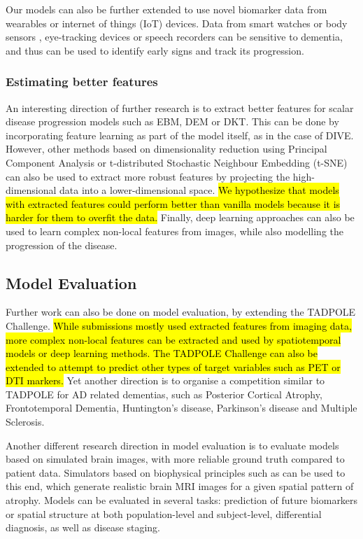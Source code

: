 Our models can also be further extended to use novel biomarker data from wearables or internet of things (IoT) devices. Data from smart watches or body sensors \cite{hsu2014gait}, eye-tracking devices \cite{hutton1984eye} or speech recorders \cite{hoffmann2010temporal} can be sensitive to dementia, and thus can be used to identify early signs and track its progression. 

\subsubsection{Estimating better features}
\label{sec:conMetFea}

An interesting direction of further research is to extract better features for scalar disease progression models such as EBM, DEM or DKT. This can be done by incorporating feature learning as part of the model itself, as in the case of DIVE. However, other methods based on dimensionality reduction using Principal Component Analysis or t-distributed Stochastic Neighbour Embedding (t-SNE) \cite{hinton2003stochastic} can also be used to extract more robust features by projecting the high-dimensional data into a lower-dimensional space. \hl{We hypothesize that  models with extracted features could perform better than vanilla models because it is harder for them to overfit the data.} Finally, deep learning approaches can also be used to learn complex non-local features from images, while also modelling the progression of the disease.

\subsection{Model Evaluation}
\label{sec:conEva}

Further work can also be done on model evaluation, by extending the TADPOLE Challenge. \hl{While submissions mostly used extracted features from imaging data, more complex non-local features can be extracted and used by spatiotemporal models or deep learning methods. The TADPOLE Challenge can also be extended to attempt to predict other types of target variables such as PET or DTI markers.} Yet another direction is to organise a competition similar to TADPOLE for AD related dementias, such as Posterior Cortical Atrophy, Frontotemporal Dementia, Huntington's disease, Parkinson's disease and Multiple Sclerosis.

Another different research direction in model evaluation is to evaluate models based on simulated brain images, with more reliable ground truth compared to patient data. Simulators based on biophysical principles such as \cite{khanal2016biophysical} can be used to this end, which generate realistic brain MRI images for a given spatial pattern of atrophy. Models can be evaluated in several tasks: prediction of future biomarkers or spatial structure at both population-level and subject-level, differential diagnosis, as well as disease staging. 
% 


